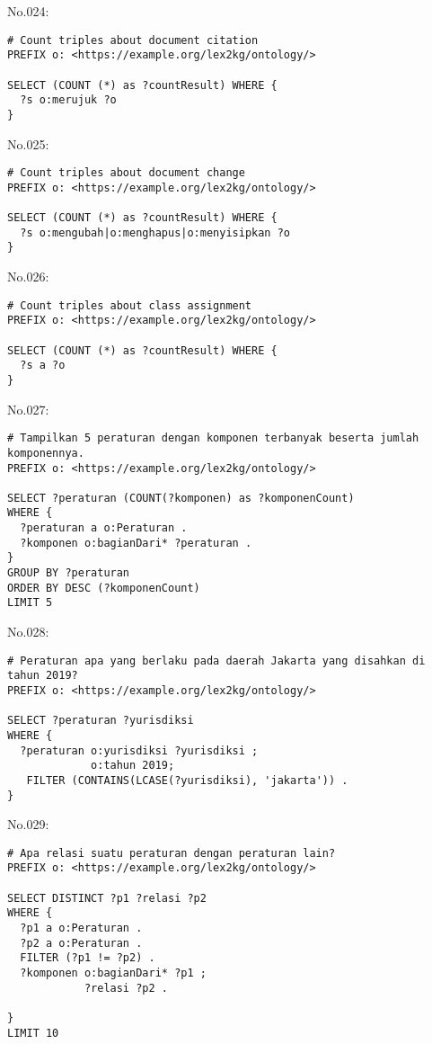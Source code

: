 \noindent No.024:
\begin{lstlisting}
# Count triples about document citation
PREFIX o: <https://example.org/lex2kg/ontology/>

SELECT (COUNT (*) as ?countResult) WHERE {
  ?s o:merujuk ?o
} 

\end{lstlisting}


\noindent No.025:
\begin{lstlisting}
# Count triples about document change
PREFIX o: <https://example.org/lex2kg/ontology/>

SELECT (COUNT (*) as ?countResult) WHERE {
  ?s o:mengubah|o:menghapus|o:menyisipkan ?o
} 

\end{lstlisting}


\noindent No.026:
\begin{lstlisting}
# Count triples about class assignment
PREFIX o: <https://example.org/lex2kg/ontology/>

SELECT (COUNT (*) as ?countResult) WHERE {
  ?s a ?o
} 

\end{lstlisting}


\noindent No.027:
\begin{lstlisting}
# Tampilkan 5 peraturan dengan komponen terbanyak beserta jumlah komponennya.
PREFIX o: <https://example.org/lex2kg/ontology/>

SELECT ?peraturan (COUNT(?komponen) as ?komponenCount)
WHERE {
  ?peraturan a o:Peraturan .
  ?komponen o:bagianDari* ?peraturan .
}
GROUP BY ?peraturan
ORDER BY DESC (?komponenCount)
LIMIT 5

\end{lstlisting}


\noindent No.028:
\begin{lstlisting}
# Peraturan apa yang berlaku pada daerah Jakarta yang disahkan di tahun 2019?
PREFIX o: <https://example.org/lex2kg/ontology/>

SELECT ?peraturan ?yurisdiksi
WHERE {
  ?peraturan o:yurisdiksi ?yurisdiksi ;
             o:tahun 2019;
   FILTER (CONTAINS(LCASE(?yurisdiksi), 'jakarta')) .
}
\end{lstlisting}


\noindent No.029:
\begin{lstlisting}
# Apa relasi suatu peraturan dengan peraturan lain?
PREFIX o: <https://example.org/lex2kg/ontology/>

SELECT DISTINCT ?p1 ?relasi ?p2
WHERE {
  ?p1 a o:Peraturan .
  ?p2 a o:Peraturan .
  FILTER (?p1 != ?p2) .
  ?komponen o:bagianDari* ?p1 ;
            ?relasi ?p2 .

}
LIMIT 10
\end{lstlisting}


